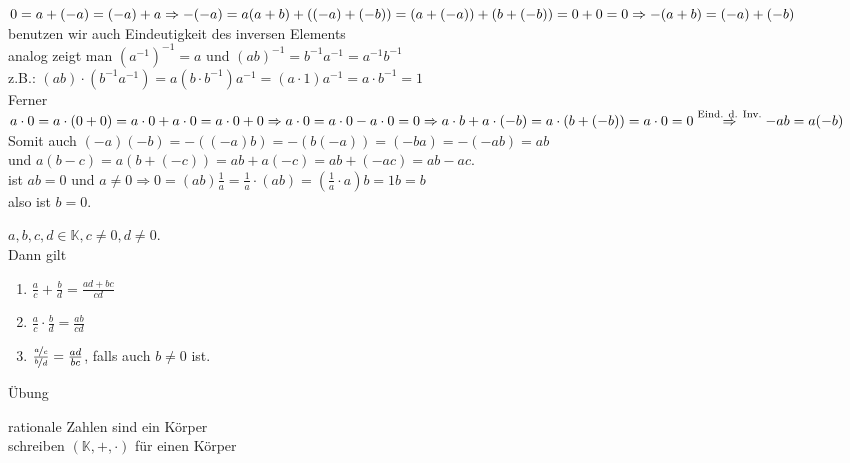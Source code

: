 \documentclass[../ana1.tex]{subfiles}
\begin{document}
\begin{bew}
	\(0 = a + (-a) = (-a) + a \\
	\Rightarrow -(-a) = a \\
	(a+b) + ((-a)+(-b)) = (a+(-a))+(b+(-b))=0+0=0 \\
	\Rightarrow -(a+b)=(-a)+(-b)\) \\
	benutzen wir auch Eindeutigkeit des inversen Elements\\
	analog zeigt man \({(a^{-1})}^{-1} = a\) und \({(ab)}^{-1} = b^{-1}a^{-1}=a^{-1}b^{-1}\) \\
	z.B.: \((ab)\cdot (b^{-1}a^{-1})=a(b\cdot b^{-1}) a^{-1} = (a\cdot 1)a^{-1} = a\cdot b^{-1}=1\) \\
	Ferner \(a\cdot 0 = a\cdot(0+0)=a\cdot 0 + a\cdot 0 = a\cdot 0 + 0 \\
		\Rightarrow a\cdot 0 = a\cdot 0 - a\cdot 0 = 0 \\
		\Rightarrow a\cdot b + a\cdot (-b) = a\cdot (b+(-b)) = a\cdot 0=0 \\
		\overset{\text{Eind. d. Inv.}}{\Rightarrow} -ab=a(-b)\) \\
	Somit auch \((-a)(-b) = -((-a)b) = -(b(-a)) = (-ba) = -(-ab) = ab\) \\
	und \(a(b-c) = a(b+(-c))=ab+a(-c)=ab+(-ac)=ab-ac\). \\
	ist \(ab = 0\) und \(a\neq 0 \Rightarrow 0=(ab)\frac{1}{a}=\frac{1}{a}\cdot (ab)=(\frac{1}{a}\cdot a)b = 1b = b\) \\
	also ist \(b=0\).
\end{bew}
\begin{satz}[Bruchrechnen]
	\(a,b,c,d\in\mathbb{K}, c\neq 0, d\neq 0\). \\
	Dann gilt
	\begin{enumerate}
		\item \(\frac{a}{c}+\frac{b}{d}=\frac{ad+bc}{cd}\)
		\item \(\frac{a}{c}\cdot\frac{b}{d}=\frac{ab}{cd}\)
		\item \(\frac{\nicefrac{a}{c}}{\nicefrac{b}{d}} = \frac{ad}{bc}\), falls auch \(b\neq 0\) ist.
	\end{enumerate}
\end{satz}
\begin{bew}
	Übung
\end{bew}
\begin{bsp}
	rationale Zahlen sind ein Körper\\
	schreiben \((\mathbb{K},+,\cdot)\) für einen Körper
\end{bsp}
\end{document}
